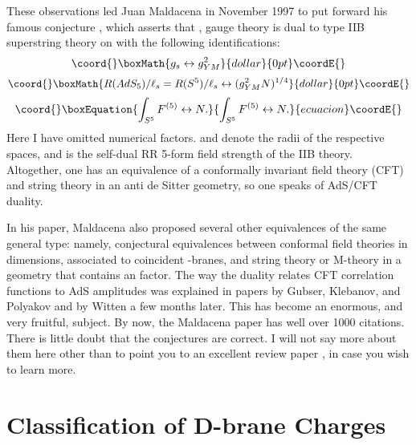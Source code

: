 \documentclass[a4paper,12pt]{article}
\begin{document}
These observations led Juan Maldacena in November 1997 to put
forward his famous conjecture \cite{JM}, which asserts that \coordHE{},
\coordHE{}  \coordHE{} gauge theory is dual to type IIB superstring theory
on \coordHE{} with the following identifications: $$\coord{}\boxMath{ g_s
\leftrightarrow g^2_{YM}}{dollar}{0pt}\coordE{}$$  $$\coord{}\boxMath{ R(AdS_5)/\ell_s = R(S^5)/\ell_s
\leftrightarrow (g_{YM}^2 N)^{1/4}}{dollar}{0pt}\coordE{}$$
\begin{equation}\coord{}\boxEquation{
\int_{S^5} F^{(5)} \leftrightarrow N.
}{
\int_{S^5} F^{(5)} \leftrightarrow N.
}{ecuacion}\coordE{}\end{equation}
Here I have omitted numerical factors.  \coordHE{} and \coordHE{}
denote the radii of the respective spaces, and \coordHE{} is the
self-dual RR 5-form field strength of the IIB theory. Altogether,
one has an equivalence of a conformally invariant field theory
(CFT) and string theory in an anti de Sitter geometry, so one
speaks of AdS/CFT duality.

In his paper, Maldacena also proposed several other equivalences
of the same general type: namely, conjectural equivalences between
conformal field theories in \coordHE{} dimensions, associated to
coincident \coordHE{}-branes, and string theory or M-theory in a geometry
that contains an \coordHE{} factor. The way the duality relates
CFT correlation functions to AdS amplitudes was explained in
papers by Gubser, Klebanov, and Polyakov \cite{GKP} and by Witten
\cite{W1} a few months later. This has become an enormous, and
very fruitful, subject. By now, the Maldacena paper has well over
1000 citations. There is little doubt that the conjectures are
correct. I will not say more about them here other than to point
you to an excellent review paper \cite{MAGOO}, in case you wish to
learn more.

\section{Classification of D-brane Charges}
\end{document}
